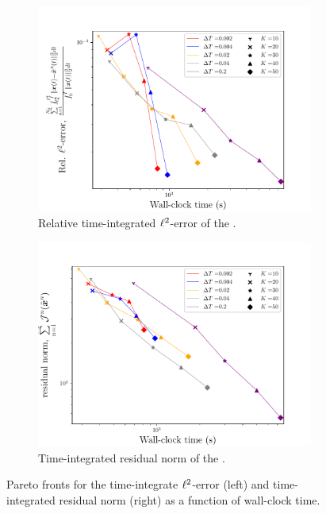 \begin{figure}
\begin{center}
\begin{subfigure}[t]{0.45\textwidth}
\includegraphics[width=1.\linewidth]{figs/sod/pareto_error.pdf}
\caption{Relative time-integrated $\ell^2$-error of the \methodAcronymROM.}
\label{fig:sod_error_converge}
\end{subfigure}
\begin{subfigure}[t]{0.45\textwidth}
\includegraphics[width=1.\linewidth]{figs/sod/pareto_resids.pdf}
\caption{Time-integrated residual norm of the \methodAcronymROM.} 
\label{fig:sod_residual_converge}
\end{subfigure}
\caption{Pareto fronts for the time-integrate $\ell^2$-error (left) and time-integrated residual norm (right) as a function of wall-clock time.} 
\label{fig:convergence_study_pareto}
\end{center}
\end{figure}


